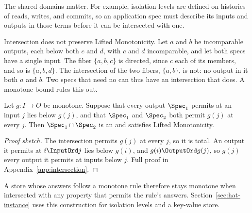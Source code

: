 The shared domains matter.  For example, isolation levels are defined on
histories of reads, writes, and commits, so an application spec must describe
its inputs and outputs in those terms before it can be intersected with one.

Intersection does not preserve Lifted Monotonicity.  Let $a$ and $b$ be
incomparable outputs, each below both $c$ and $d$, with $c$ and $d$
incomparable, and let both specs have a single input.  The fiber $\{a,b,c\}$ is
directed, since $c$ \outrel each of its members, and so is $\{a,b,d\}$.  The
intersection of the two fibers, $\{a,b\}$, is not: no output in it \outrel
both $a$ and $b$.  Two specs that need no \commitment can thus have an
intersection that does.  A
monotone bound rules this out.

\begin{proposition}
\label{prop:intersection-bound}
Let $g:I\to O$ be monotone.  Suppose that every output $\Spec_1$ permits at an
input $j$ lies below $g(j)$, and that $\Spec_1$ and $\Spec_2$ both permit $g(j)$
at every $j$.  Then $\Spec_1\cap\Spec_2$ is an \spectype and satisfies Lifted
Monotonicity.
\end{proposition}

\begin{proof}[Proof sketch]
The intersection permits $g(j)$ at every $j$, so it is total.  An output it
permits at $i\InputOrd j$ lies below $g(i)$, and $g(i)\OutputOrd g(j)$, so
$g(j)$ \outrel every output it permits at inputs below $j$.  Full proof in
Appendix~\ref{app:intersection}.
\end{proof}

A store whose answers follow a monotone rule therefore stays monotone when
intersected with any property that permits the rule's answers.
Section~\ref{sec:hat-instance} uses this construction for isolation levels and
a key-value store.
